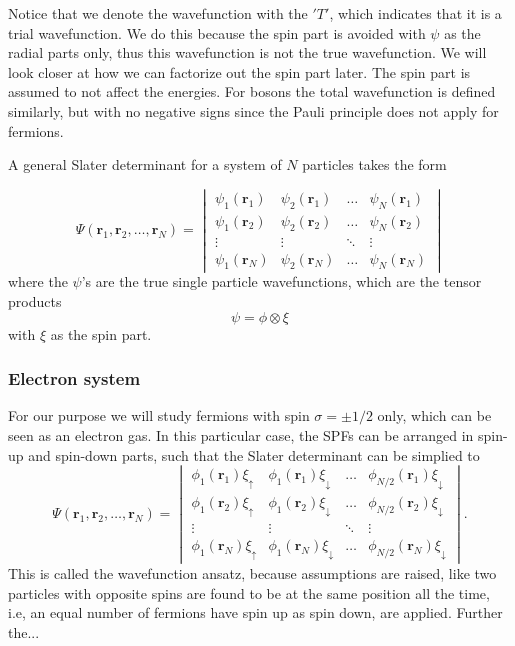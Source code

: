 Notice that we denote the wavefunction with the $'T'$, which indicates that it is a trial wavefunction. We do this because the spin part is avoided with $\psi$ as the radial parts only, thus this wavefunction is not the true wavefunction. We will look closer at how we can factorize out the spin part later. The spin part is assumed to not affect the energies. For bosons the total wavefunction is defined similarly, but with no negative signs since the Pauli principle does not apply for fermions. 

A general Slater determinant for a system of $N$ particles takes the form

\begin{equation}
\Psi(\boldsymbol{r}_1,\boldsymbol{r}_2,\hdots,\boldsymbol{r}_N)=
\begin{vmatrix}
\psi_1(\boldsymbol{r}_1) & \psi_2(\boldsymbol{r}_1) & \hdots & \psi_N(\boldsymbol{r}_1)\\
\psi_1(\boldsymbol{r}_2) & \psi_2(\boldsymbol{r}_2) & \hdots & \psi_N(\boldsymbol{r}_2)\\
\vdots & \vdots & \ddots & \vdots \\
\psi_1(\boldsymbol{r}_N) & \psi_2(\boldsymbol{r}_N) & \hdots & \psi_N(\boldsymbol{r}_N)
\end{vmatrix}
\end{equation}
where the $\psi$'s are the true single particle wavefunctions, which are the tensor products 
\begin{equation}
\psi=\phi\otimes\xi
\end{equation}
with $\xi$ as the spin part. 

\subsubsection{Electron system} \label{subsubsec:electronsystem}
For our purpose we will study fermions with spin $\sigma=\pm 1/2$ only, which can be seen as an electron gas. In this particular case, the SPFs can be arranged in spin-up and spin-down parts, such that the Slater determinant can be simplied to 
\begin{equation}
\Psi(\boldsymbol{r}_1,\boldsymbol{r}_2,\hdots,\boldsymbol{r}_N)=
\begin{vmatrix}
\phi_1(\boldsymbol{r}_1)\xi_{\uparrow} & \phi_1(\boldsymbol{r}_1)\xi_{\downarrow} & \hdots & \phi_{N/2}(\boldsymbol{r}_1)\xi_{\downarrow}\\
\phi_1(\boldsymbol{r}_2)\xi_{\uparrow} & \phi_1(\boldsymbol{r}_2)\xi_{\downarrow} & \hdots & \phi_{N/2}(\boldsymbol{r}_2)\xi_{\downarrow}\\
\vdots & \vdots & \ddots & \vdots \\
\phi_1(\boldsymbol{r}_N)\xi_{\uparrow} & \phi_1(\boldsymbol{r}_N)\xi_{\downarrow} & \hdots & \phi_{N/2}(\boldsymbol{r}_N)\xi_{\downarrow}
\end{vmatrix}.
\end{equation}
This is called the wavefunction ansatz, because assumptions are raised, like two particles with opposite spins are found to be at the same position all the time, i.e, an equal number of fermions have spin up as spin down, are applied. Further the...

